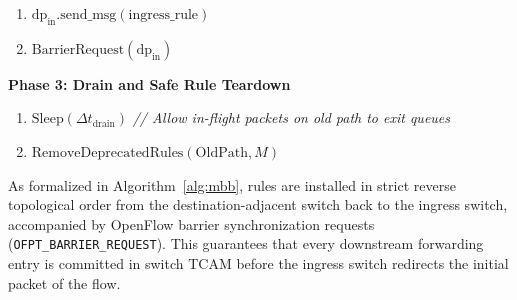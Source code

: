 \begin{tcolorbox}[colback=codebg,colframe=sdnnavy!80,arc=3pt,title=\textbf{Algorithm 1: Make-Before-Break (MBB) Flow-Mod Installation Protocol}]
\begin{enumerate}[leftmargin=1.5em,noitemsep,resume]
  \item $\text{dp}_{\text{in}}.\text{send\_msg}(\text{ingress\_rule})$
  \item $\text{BarrierRequest}(\text{dp}_{\text{in}})$
\end{enumerate}
\textbf{Phase 3: Drain and Safe Rule Teardown}
\begin{enumerate}[leftmargin=1.5em,noitemsep,resume]
  \item $\text{Sleep}(\Delta t_{\text{drain}})$ \quad \textit{// Allow in-flight packets on old path to exit queues}
  \item $\text{RemoveDeprecatedRules}(\text{OldPath}, M)$
\end{enumerate}
\end{tcolorbox}

As formalized in Algorithm~\ref{alg:mbb}, rules are installed in strict reverse topological order from the destination-adjacent switch back to the ingress switch, accompanied by OpenFlow barrier synchronization requests (\texttt{OFPT\_BARRIER\_REQUEST}). This guarantees that every downstream forwarding entry is committed in switch TCAM before the ingress switch redirects the initial packet of the flow.
